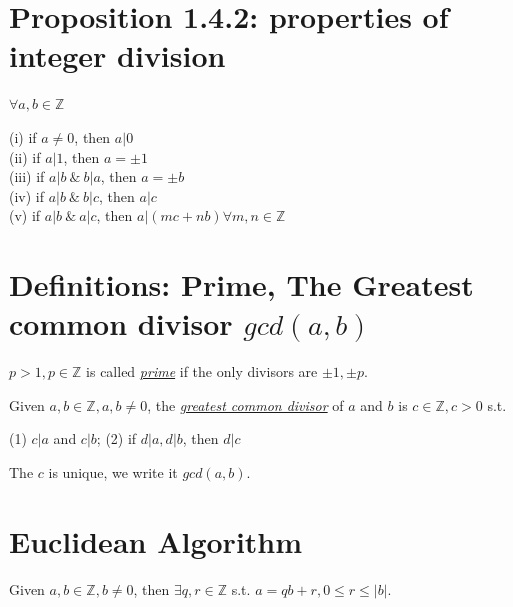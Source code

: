 \documentclass[11pt]{elegantbook}
\begin{document}
\section{Proposition 1.4.2: properties of integer division}
\begin{proposition}[Proposition 1.4.2]
    $\forall a,b\in\mathbb{Z}$
\end{proposition}
(i) if $a\neq0$, then $a|0$\\
(ii) if $a|1$, then $a=\pm 1$\\
(iii) if $a|b\ \&\ b|a$, then $a=\pm b$\\
(iv) if $a|b\ \&\ b|c$, then $a|c$\\
(v) if $a|b\ \&\ a|c$, then $a|(mc+nb)\forall m,n\in\mathbb{Z}$\\

\section{Definitions: Prime, The Greatest common divisor $gcd(a,b)$}
$p > 1, p \in \mathbb{Z}$ is called
\underline{\textit{prime}} if the only divisors are
$\pm 1,\pm p$.

Given $a,b\in\mathbb{Z},a, b\neq 0$, the \underline{\textit{greatest common divisor}} of $a$ and $b$ is $c\in\mathbb{Z}, c>0$ s.t.

(1) $c|a$ and $c|b$; (2) if $d|a, d|b$, then $d|c$

The $c$ is unique, we write it $gcd(a,b)$.

\section{Euclidean Algorithm}
\begin{proposition}
    Given $a,b\in\mathbb{Z},b\neq 0$, then $\exists q,r\in \mathbb{Z}$ s.t. $a=qb+r, 0\leq r\leq |b|$.
\end{proposition}
\end{document}
